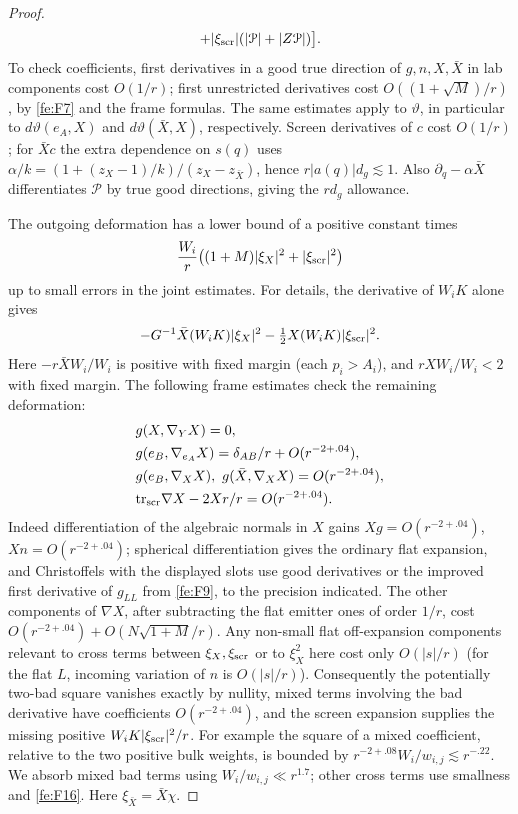 \begin{proof}
\begin{equation*}
     +|\xi_{\rm scr}|(|\mathcal P|+|Z\mathcal P|)\big].
\end{equation*}
To check coefficients, first derivatives in a good true direction of \(g,n,X,\bar X\) in lab components cost \(O(1/r)\); first unrestricted derivatives cost \(O((1+\sqrt M)/r)\), by \eqref{fe:F7} and the frame formulas. The same estimates apply to \(\vartheta\), in particular to \(d\vartheta(e_A,X)\) and \(d\vartheta(\bar X,X)\), respectively. Screen derivatives of \(c\) cost \(O(1/r)\); for \(\bar X c\) the extra dependence on \(s(q)\) uses \(\alpha/k=(1+(z_X-1)/k)/(z_X-z_{\bar X})\), hence \(r|a(q)|d_g\lesssim1\). Also \(\partial_q-\alpha\bar X\) differentiates \(\mathcal P\) by true good directions, giving the \(r d_g\) allowance.

The outgoing deformation has a lower bound of a positive constant times
\begin{equation}\label{fe:F16}
\frac{W_i}{r}\big((1+M)|\xi_X|^2+|\xi_{\rm scr}|^2\big)
\end{equation}
up to small errors in the joint estimates. For details, the derivative of \(W_iK\) alone gives
\begin{equation*}
 -G^{-1}\bar X(W_iK)|\xi_X|^2-\tfrac12 X(W_iK)|\xi_{\rm scr}|^2.
\end{equation*}
Here \(-r\bar XW_i/W_i\) is positive with fixed margin (each \(p_i>A_i\)), and \(r XW_i/W_i<2\) with fixed margin. The following frame estimates check the remaining deformation:
\begin{equation*}
\begin{split}
  &g(X,\nabla_Y X)=0,\\
  &g(e_B,\nabla_{e_A}X)=\delta_{AB}/r+O(r^{-2+.04}),\\
  &g(e_B,\nabla_X X),\ g(\bar X,\nabla_X X)=O(r^{-2+.04}),\\
  &{\rm tr}_{\rm scr}\nabla X-2Xr/r=O(r^{-2+.04}).
 \end{split}
\end{equation*}
Indeed differentiation of the algebraic normals in \(X\) gains \(Xg=O(r^{-2+.04})\), \(Xn=O(r^{-2+.04})\); spherical differentiation gives the ordinary flat expansion, and Christoffels with the displayed slots use good derivatives or the improved first derivative of \(g_{LL}\) from \eqref{fe:F9}, to the precision indicated. The other components of \(\nabla X\), after subtracting the flat emitter ones of order \(1/r\), cost \(O(r^{-2+.04})+O(N\sqrt{1+M}/r)\). Any non-small flat off-expansion components relevant to cross terms between \(\xi_X,\xi_{\rm scr}\) or to \(\xi_X^2\) here cost only \(O(|s|/r)\) (for the flat \(L\), incoming variation of \(n\) is \(O(|s|/r)\)). Consequently the potentially two-bad square vanishes exactly by nullity, mixed terms involving the bad derivative have coefficients \(O(r^{-2+.04})\), and the screen expansion supplies the missing positive \(W_iK|\xi_{\rm scr}|^2/r\). For example the square of a mixed coefficient, relative to the two
positive bulk weights, is bounded by
$r^{-2+.08}W_i/w_{i,j}\lesssim r^{-.22}$.
We absorb mixed bad terms using \(W_i/w_{i,j}\ll r^{1.7}\); other cross terms use smallness and \eqref{fe:F16}. Here \(\xi_{\bar X}=\bar X\chi\).


\end{proof}
